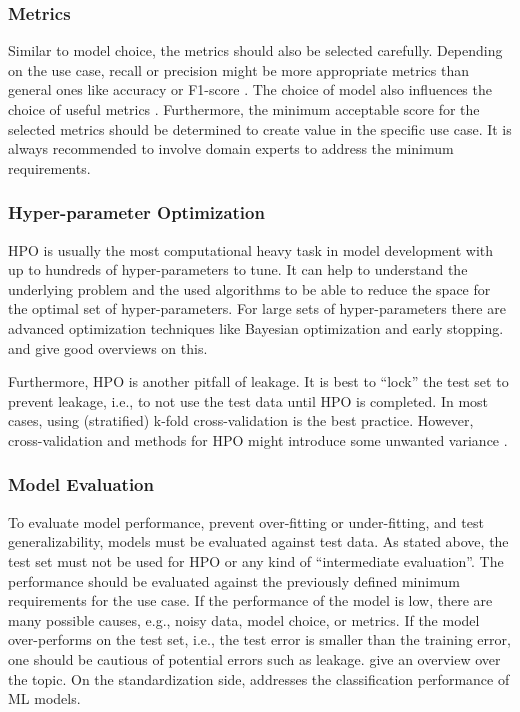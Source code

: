 \subsubsection{Metrics}
Similar to model choice, the metrics should also be selected carefully. Depending on the use case,  recall or precision might be more appropriate metrics than general ones like accuracy or F1-score \citep{poretschkin2021_IAIS_Leitfaden}. The choice of model also influences the choice of useful metrics  \citep{naser2021_metrics, ferri2009metrics}. Furthermore, the minimum acceptable score for the selected metrics should be determined to create value in the specific use case. It is always recommended to involve domain experts to address the minimum requirements.

\subsubsection{Hyper-parameter Optimization}
\ac{HPO} is usually the most computational heavy task in model development with up to hundreds of hyper-parameters to tune. It can help to understand the underlying problem and the used algorithms to be able to reduce the space for the optimal set of hyper-parameters. For large sets of hyper-parameters there are advanced optimization techniques like Bayesian optimization and early stopping. \citet{feurer2019hyperparameter} and \citet{yang2020_hyperparameter} give good overviews on this.

Furthermore, \ac{HPO} is another pitfall of leakage. It is best to ``lock'' the test set to prevent leakage, i.e., to not use the test data until \ac{HPO} is completed. In most cases, using (stratified) k-fold cross-validation is the best practice. However, cross-validation and methods for \ac{HPO} might introduce some unwanted variance \citep{Bouthillier2021_Variance, Wong2019_ReliableCV, yang2020_hyperparameter, bischl2021_hyperparameter}. 

\subsubsection{Model Evaluation}
To evaluate model performance, prevent over-fitting or under-fitting, and test generalizability, models must be evaluated against test data. As stated above, the test set must not be used for \ac{HPO} or any kind of ``intermediate evaluation''. The performance should be evaluated against the previously defined minimum requirements for the use case. If the performance of the model is low, there are many possible causes, e.g., noisy data, model choice, or metrics. If the model over-performs on the test set, i.e., the test error is smaller than the training error, one should be cautious of potential errors such as leakage. \citet{zhang2020_MLtesting, Braiek2018_MLtesting} give an overview over the topic. On the standardization side, \cite{ISO4213} addresses the classification performance of \ac{ML} models.

